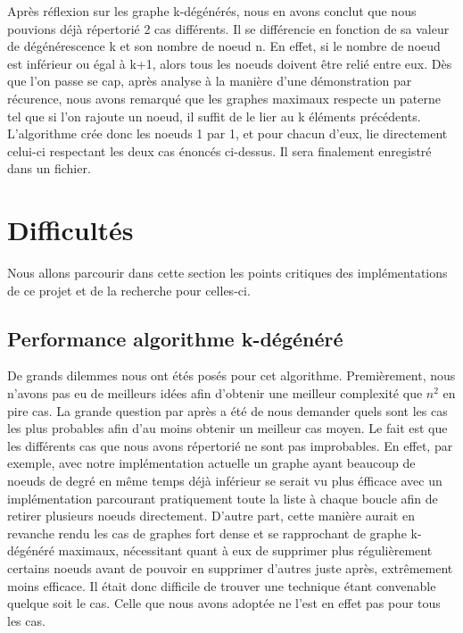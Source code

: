\documentclass[a4paper, 11pt, oneside]{article}
\begin{document}
Après réflexion sur les graphe k-dégénérés, nous en avons conclut que nous pouvions déjà 
répertorié 2 cas différents. Il se différencie en fonction de sa valeur de dégénérescence k 
et son nombre de noeud n. En effet, si le nombre de noeud est inférieur ou égal à 
k+1, alors tous les noeuds doivent être relié entre eux. Dès que l'on passe se cap, 
après analyse à la manière d'une démonstration par récurence, nous avons remarqué 
que les graphes maximaux respecte un paterne tel que si l'on rajoute un noeud, il 
suffit de le lier au k éléments précédents.
\\L'algorithme crée donc les noeuds 1 par 1, et pour chacun d'eux, lie directement celui-ci 
respectant les deux cas énoncés ci-dessus. Il sera finalement enregistré 
dans un fichier.


\section{\textbf{Difficultés}}

Nous allons parcourir dans cette section les points critiques des implémentations 
de ce projet et de la recherche pour celles-ci.

\subsection{Performance algorithme k-dégénéré}

De grands dilemmes nous ont étés posés pour cet algorithme. Premièrement, nous n'avons 
pas eu de meilleurs idées afin d'obtenir une meilleur complexité que $n^2$ en pire cas. 
La grande question par après a été de nous demander quels sont les cas les plus probables 
afin d'au moins obtenir un meilleur cas moyen. Le fait est que les différents cas que nous 
avons répertorié ne sont pas improbables. En effet, par exemple, avec notre implémentation 
actuelle un graphe ayant beaucoup de noeuds de degré en même temps déjà inférieur se serait 
vu plus éfficace avec un implémentation parcourant pratiquement toute la liste à chaque 
boucle afin de retirer plusieurs noeuds directement. D'autre part, cette manière aurait 
en revanche rendu les cas de graphes fort dense et se rapprochant de graphe k-dégénéré maximaux, 
nécessitant quant à eux de supprimer plus régulièrement certains noeuds avant de pouvoir 
en supprimer d'autres juste après, extrêmement moins efficace. Il était donc difficile de 
trouver une technique étant convenable quelque soit le cas. Celle que nous avons 
adoptée ne l'est en effet pas pour tous les cas.
\end{document}
